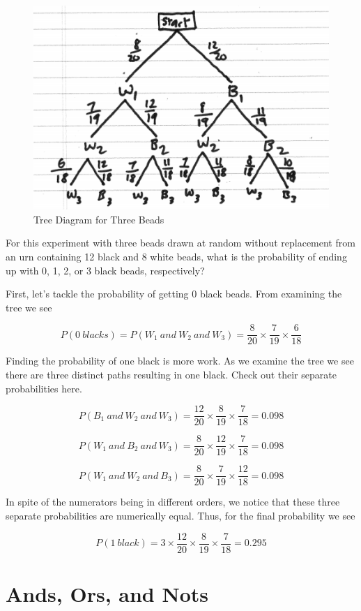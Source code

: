 \documentclass[]{book}
\theoremstyle{definition}
\theoremstyle{definition}
\theoremstyle{definition}
\theoremstyle{remark}
\begin{document}
\begin{figure}

{\centering \includegraphics[width=0.6\linewidth]{01-basics-figures/tree_urn1} 

}

\caption{Tree Diagram for Three Beads}\label{fig:nice-fig-6}
\end{figure}

For this experiment with three beads drawn at random without replacement
from an urn containing 12 black and 8 white beads, what is the
probability of ending up with 0, 1, 2, or 3 black beads, respectively?

First, let's tackle the probability of getting 0 black beads. From
examining the tree we see

\[P(0\ blacks) = P(W_{1}\ and\ W_{2}\ and\ W_{3}) = \frac{8}{20} \times \frac{7}{19} \times \frac{6}{18}\]

Finding the probability of one black is more work. As we examine the
tree we see there are three distinct paths resulting in one black. Check
out their separate probabilities here.

\[P(B_{1}\ and\ W_{2}\ and\ W_{3}) = \frac{12}{20} \times \frac{8}{19} \times \frac{7}{18} = 0.098\]

\[P(W_{1}\ and\ B_{2}\ and\ W_{3}) = \frac{8}{20} \times \frac{12}{19} \times \frac{7}{18} = 0.098\]

\[P(W_{1}\ and\ W_{2}\ and\ B_{3}) = \frac{8}{20} \times \frac{7}{19} \times \frac{12}{18} = 0.098\]

In spite of the numerators being in different orders, we notice that
these three separate probabilities are numerically equal. Thus, for the
final probability we see

\[P(1\ black) = 3 \times \frac{12}{20} \times \frac{8}{19} \times \frac{7}{18} = 0.295\]

\section{Ands, Ors, and Nots}\label{and_ors_nots}
\end{document}
